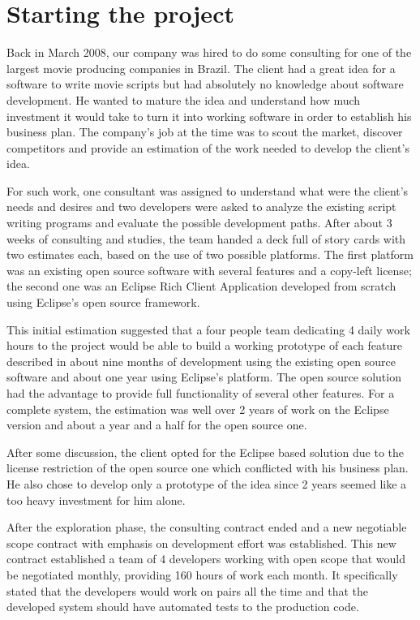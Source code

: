 \documentclass[lnbip]{svmultln}
\newcommand{\ale}[1]{}%
\begin{document}
\section{Starting the project}
\label{sec:start}

Back in March 2008, our company was hired to do some consulting for
one of the largest movie producing companies in Brazil. The client had
a great idea for a software to write movie scripts but had absolutely
no knowledge about software development.  He wanted to mature the idea
and understand how much investment it would take to turn it into
working software in order to establish his business plan. The
company's job at the time was to scout the market, discover
competitors and provide an estimation of the work needed to develop
the client's idea.

For such work, one consultant was assigned to understand what were the
client's needs and desires and two developers were asked to analyze
the existing script writing programs and evaluate the possible
development paths. After about 3 weeks of consulting and studies, the
team handed a deck full of story cards with two estimates each, based
on the use of two possible platforms. The first platform was an
existing open source software with several features and a copy-left
license; the second one was an Eclipse Rich Client Application
developed from scratch using Eclipse's open source framework.

This initial estimation suggested that a four people team dedicating 4
daily work hours to the project would be able to build a working
prototype of each feature described in about nine months of
development using the existing open source software and about one year
using Eclipse's platform. The open source solution had the advantage
to provide full functionality of several other features. For a
complete system, the estimation was well over 2 years of work on the
Eclipse version and about a year and a half for the open source one.

After some discussion, the client opted for the Eclipse based solution
due to the license restriction of the open source one which conflicted
with his business plan. He also chose to develop only a prototype of
the idea since 2 years seemed like a too heavy investment for him
alone.

After the exploration phase, the consulting contract ended and a new
negotiable scope contract\ale{tem citação pra esse tipo de contrato?}
with emphasis on development effort was established. This new contract
established a team of 4 developers working with open scope that would
be negotiated monthly, providing 160 hours of work each month. It
specifically stated that the developers would work on pairs all the
time and that the developed system should have automated tests to the
production code.
\end{document}
